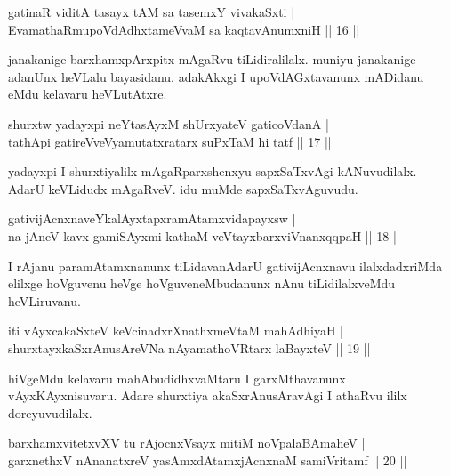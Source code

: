 
\begin{shl}
gatinaR viditA tasayx tAM sa tasemxY vivakaSxti |\\
EvamathaRmupoVdAdhxtameVvaM sa kaqtavAnumxniH \hfill || 16 || 
\end{shl}

\begin{artha}
janakanige barxhamxpArxpitx mAgaRvu tiLidiralilalx. muniyu janakanige adanUnx heVLalu bayasidanu. adakAkxgi I upoVdAGxtavanunx mADidanu eMdu kelavaru heVLutAtxre.
\end{artha}

\begin{shl}
shurxtw yadayxpi neYtasAyxM shUrxyateV gaticoVdanA |\\
tathA\s pi gatireVveVyamutatxratarx suPxTaM hi tatf \hfill || 17 || 
\end{shl}

\begin{artha}
yadayxpi I shurxtiyalilx mAgaRparxshenxyu sapxSaTxvAgi kANuvudilalx. AdarU keVLidudx mAgaRveV. idu muMde sapxSaTxvAguvudu.
\end{artha}

\begin{shl}
gativijAcnxnaveYkalAyxtapxramAtamxvidapayxsw |\\
na jAneV kavx gamiSAyxmi kathaM veVtayxbarxviVnanxqqpaH \hfill || 18 || 
\end{shl}

\begin{artha}
I rAjanu paramAtamxnanunx tiLidavanAdarU gativijAcnxnavu ilalxdadxriMda elilxge hoVguvenu heVge hoVguveneMbudanunx nAnu tiLidilalxveMdu heVLiruvanu.
\end{artha}


\begin{shl}
iti vAyxcakaSxteV keVcinadxrXnathxmeVtaM mahAdhiyaH |\\
shurxtayxkaSxrAnusAreVNa nAyamathoVR\s tarx laBayxteV \hfill || 19 || 
\end{shl}

\begin{artha}
hiVgeMdu kelavaru mahAbudidhxvaMtaru I garxMthavanunx vAyxKAyxnisuvaru. Adare shurxtiya akaSxrAnusAravAgi I athaRvu ililx doreyuvudilalx.
\end{artha}

\begin{shl}
barxhamxvitetxvXV tu rAjocnxV\s sayx mitiM noVpalaBAmaheV |\\
garxnethxV nAnanatxreV yasAmxdAtamxjAcnxnaM samiVritamf \hfill || 20 || 
\end{shl}

